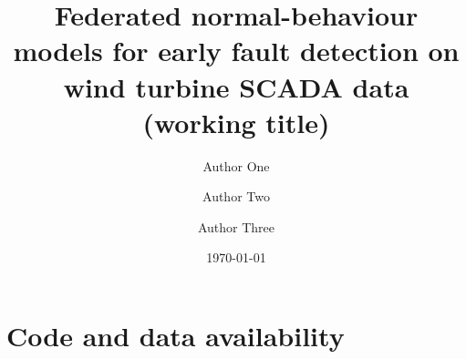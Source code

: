\documentclass[11pt]{article}
\title{Federated normal-behaviour models for early fault detection on wind turbine SCADA data (working title)}
\author{Author One \and Author Two \and Author Three}
\date{\today}
\begin{document}
\maketitle










\section*{Code and data availability}



\end{document}

